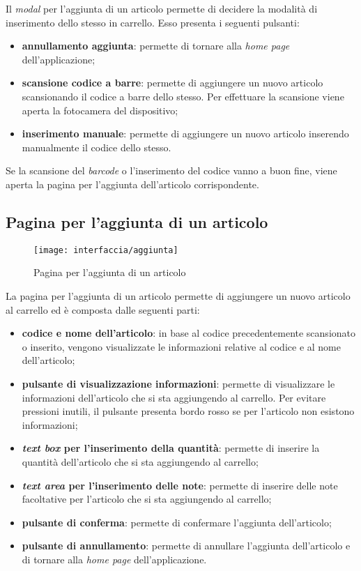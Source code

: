 Il \textit{modal} per l'aggiunta di un articolo permette di decidere la modalità di inserimento dello stesso in carrello. Esso presenta i seguenti pulsanti:
\begin{itemize}
	\item \textbf{annullamento aggiunta}: permette di tornare alla \textit{home page} dell'applicazione;
	\item \textbf{scansione codice a barre}: permette di aggiungere un nuovo articolo scansionando il codice a barre dello stesso. Per effettuare la scansione viene aperta la fotocamera del dispositivo;
	\item \textbf{inserimento manuale}: permette di aggiungere un nuovo articolo inserendo manualmente il codice dello stesso.
\end{itemize}
Se la scansione del \textit{barcode} o l'inserimento del codice vanno a buon fine, viene aperta la pagina per l'aggiunta dell'articolo corrispondente.

\newpage

\subsection{Pagina per l'aggiunta di un articolo}

\begin{figure}[!h] 
    \centering 
    \texttt{[image: interfaccia/aggiunta]} 
    \caption{Pagina per l'aggiunta di un articolo}
\end{figure}

La pagina per l'aggiunta di un articolo permette di aggiungere un nuovo articolo al carrello ed è composta dalle seguenti parti:
\begin{itemize}
	\item \textbf{codice e nome dell'articolo}: in base al codice precedentemente scansionato o inserito, vengono visualizzate le informazioni relative al codice e al nome dell'articolo;
	\item \textbf{pulsante di visualizzazione informazioni}: permette di visualizzare le informazioni dell'articolo che si sta aggiungendo al carrello. Per evitare pressioni inutili, il pulsante presenta bordo rosso se per l'articolo non esistono informazioni;
	\item \textbf{\textit{text box} per l'inserimento della quantità}: permette di inserire la quantità dell'articolo che si sta aggiungendo al carrello;
	\item \textbf{\textit{text area} per l'inserimento delle note}: permette di inserire delle note facoltative per l'articolo che si sta aggiungendo al carrello;
	\item \textbf{pulsante di conferma}: permette di confermare l'aggiunta dell'articolo;
	\item \textbf{pulsante di annullamento}: permette di annullare l'aggiunta dell'articolo e di tornare alla \textit{home page} dell'applicazione.
\end{itemize}

